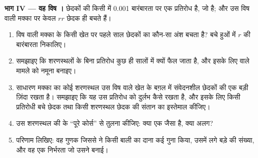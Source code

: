 \begin{problem}
\medskip
\noindent\textbf{भाग IV --- वह विष ।}
छेदकों की किसी  में 0.001 बारंबारता पर एक प्रतिरोध  है, जो
 है; और उस विष वाली मक्का पर केवल $rr$ छेदक ही बचते हैं।
\begin{enumerate}[resume]
  \item विष वाली मक्का के किसी खेत पर पहले साल छेदकों का कौन-सा अंश बचता
        है? बचे हुओं में $r$ की बारंबारता निकालिए।
  \item समझाइए कि शरणस्थलों के बिना प्रतिरोध कुछ ही सालों में क्यों फैल
        जाता है, और इसके लिए  वाले मामले को नमूना बनाइए।
  \item साधारण मक्का का कोई शरणस्थल उस विष वाले खेत के बग़ल में संवेदनशील
        छेदकों की एक बड़ी  ज़िंदा रखता है। समझाइए कि यह उस प्रतिरोध
         को दुर्लभ कैसे रखता है, और इसके लिए किसी प्रतिरोधी बचे
        छेदक तथा किसी शरणस्थल छेदक की संतान का  इस्तेमाल कीजिए।
  \item उस शरणस्थल की  के ``पूरे कोर्स'' से तुलना कीजिए: क्या
        एक जैसा है, क्या अलग?
  \item परिणाम लिखिए: वह गुणक जिससे  ने किसी बाली का दाना कई गुना
        किया, उसमें लगे बड़े  की संख्या, और वह एक निर्भरता जो उसने बनाई।
\end{enumerate}
\end{problem}

